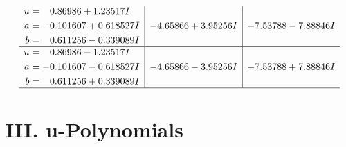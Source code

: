 \documentclass[1p]{elsarticle_modified}
\theoremstyle{definition}
\begin{document}
$$\begin{array}{c|c|c}
\begin{aligned}
u &= \phantom{-}0.86986 + 1.23517 I \\
a &= -0.101607 + 0.618527 I \\
b &= \phantom{-}0.611256 - 0.339089 I\end{aligned}
 & -4.65866 + 3.95256 I & -7.53788 - 7.88846 I \\ \hline\begin{aligned}
u &= \phantom{-}0.86986 - 1.23517 I \\
a &= -0.101607 - 0.618527 I \\
b &= \phantom{-}0.611256 + 0.339089 I\end{aligned}
 & -4.65866 - 3.95256 I & -7.53788 + 7.88846 I\\
 \hline 
 \end{array}$$\newpage
\newpage\renewcommand{\arraystretch}{1}
\centering \section*{ III. u-Polynomials}
\end{document}
